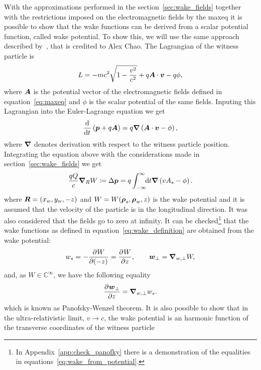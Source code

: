     With the approximations performed in the section~\ref{sec:wake_fields} together with the restrictions imposed on the electromagnetic fields by the \gls{maxeq} it is possible to show that the wake functions can be derived from a scalar potential function, called wake potential. To show this, we will use the same approach described by~, that is credited to Alex Chao. The Lagrangian of the witness particle is
    \begin{align}
  	  	L = -mc^2\sqrt{1 - \frac{v^2}{c^2}} + q\boldsymbol{A}\cdot\boldsymbol{v} - q\phi,
    \end{align}
    where $\boldsymbol{A}$ is the potential vector of the electromagnetic fields defined in equation~\eqref{eq:maxeq} and $\phi$ is the scalar potential of the same fields. Inputing this Lagrangian into the Euler-Lagrange equation we get
    \begin{align}
	  	\frac{\mathrm{d}^{{}}}{\mathrm{d} t^{{}}} \left(\boldsymbol{p} + q\boldsymbol{A}\right) = q\boldsymbol{\nabla}\left( \boldsymbol{A}\cdot\boldsymbol{v} - \phi\right),
    \end{align}
    where $\boldsymbol{\nabla}$ denotes derivation with respect to the witness particle position. Integrating the equation above with the considerations made in section~\ref{sec:wake_fields} we get
    \begin{align}
   		\frac{qQ}{c} \boldsymbol{\nabla}_R W \coloneqq \Delta\boldsymbol{p} = q\int_{-\infty}^{\infty}\!\!\text{d}t \boldsymbol{\nabla}\left(vA_s - \phi \right).
    \end{align}
    where $\boldsymbol{R} =(x_w, y_w, -z)$ and $W = W(\boldsymbol{\rho}_s, \boldsymbol{\rho}_w, z)$ is the wake potential and it is assumed that the velocity of the particle is in the longitudinal direction. It was also considered that the fields go to zero at infinity. It can be checked\footnote{In Appendix~\ref{app:check_panofky} there is a demonstration of the equalities in equations~\eqref{eq:wake_from_potential}.} that the wake functions as defined in equation~\eqref{eq:wake_definition} are obtained from the wake potential:
    \begin{align}\label{eq:wake_from_potential}
   		w_s = - \frac{\partial^{{}}W}{\partial (-z)^{{}}} = \frac{\partial^{{}}W}{\partial z^{{}}},\qquad \boldsymbol{w}_\perp = \boldsymbol{\nabla}_{w,\perp} W,
    \end{align}
    and, as $W \in \mathbb{C}^{\infty}$, we have the following equality
    \begin{align}\label{eq:panofsky_wenzel_theorem}
   		\frac{\partial^{{}}\boldsymbol{w}_\perp}{\partial z^{{}}} = \boldsymbol{\nabla}_{w,\perp} w_s.
    \end{align}
    which is known as Panofsky-Wenzel theorem. It is also possible to show that in the ultra-relativistic limit, $v \to c$, the wake potential is an harmonic function of the transverse coordinates of the witness particle~\cite{Stupakov2000a}
